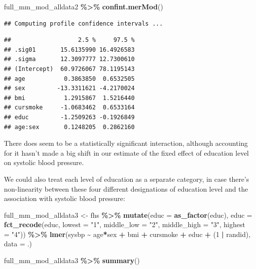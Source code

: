 \documentclass[
]{book}
\newenvironment{Shaded}{\begin{snugshade}}{\end{snugshade}}
\newcommand{\AttributeTok}[1]{\textcolor[rgb]{0.13,0.29,0.53}{#1}}
\newcommand{\DecValTok}[1]{\textcolor[rgb]{0.00,0.00,0.81}{#1}}
\newcommand{\FunctionTok}[1]{\textcolor[rgb]{0.13,0.29,0.53}{\textbf{#1}}}
\newcommand{\NormalTok}[1]{#1}
\newcommand{\OtherTok}[1]{\textcolor[rgb]{0.56,0.35,0.01}{#1}}
\newcommand{\SpecialCharTok}[1]{\textcolor[rgb]{0.81,0.36,0.00}{\textbf{#1}}}
\newcommand{\StringTok}[1]{\textcolor[rgb]{0.31,0.60,0.02}{#1}}
\begin{document}
\begin{Shaded}
\begin{Highlighting}[]
\NormalTok{full\_mm\_mod\_alldata2 }\SpecialCharTok{\%\textgreater{}\%} 
  \FunctionTok{confint.merMod}\NormalTok{()}
\end{Highlighting}
\end{Shaded}

\begin{verbatim}
## Computing profile confidence intervals ...
\end{verbatim}

\begin{verbatim}
##                   2.5 %     97.5 %
## .sig01       15.6135990 16.4926583
## .sigma       12.3097777 12.7300610
## (Intercept)  60.9726067 78.1195143
## age           0.3863850  0.6532505
## sex         -13.3311621 -4.2170024
## bmi           1.2915867  1.5216440
## cursmoke     -1.0683462  0.6533164
## educ         -1.2509263 -0.1926849
## age:sex       0.1248205  0.2862160
\end{verbatim}

There does seem to be a statistically significant interaction, although
accounting for it hasn't made a big shift in our estimate of the fixed effect
of education level on systolic blood pressure.

We could also treat each level of education as a separate category, in case
there's non-linearity between these four different designations of education
level and the association with systolic blood pressure:

\begin{Shaded}
\begin{Highlighting}[]
\NormalTok{full\_mm\_mod\_alldata3 }\OtherTok{\textless{}{-}}\NormalTok{ fhs }\SpecialCharTok{\%\textgreater{}\%} 
  \FunctionTok{mutate}\NormalTok{(}\AttributeTok{educ =} \FunctionTok{as\_factor}\NormalTok{(educ),}
         \AttributeTok{educ =} \FunctionTok{fct\_recode}\NormalTok{(educ, }
                           \AttributeTok{lowest =} \StringTok{"1"}\NormalTok{, }
                           \AttributeTok{middle\_low =} \StringTok{"2"}\NormalTok{, }
                           \AttributeTok{middle\_high =} \StringTok{"3"}\NormalTok{, }
                           \AttributeTok{highest =} \StringTok{"4"}\NormalTok{)) }\SpecialCharTok{\%\textgreater{}\%} 
  \FunctionTok{lmer}\NormalTok{(sysbp }\SpecialCharTok{\textasciitilde{}}\NormalTok{ age}\SpecialCharTok{*}\NormalTok{sex }\SpecialCharTok{+}\NormalTok{ bmi }\SpecialCharTok{+}\NormalTok{ cursmoke }\SpecialCharTok{+}\NormalTok{ educ }\SpecialCharTok{+}\NormalTok{ (}\DecValTok{1} \SpecialCharTok{|}\NormalTok{ randid), }
       \AttributeTok{data =}\NormalTok{ .) }

\NormalTok{full\_mm\_mod\_alldata3 }\SpecialCharTok{\%\textgreater{}\%} 
  \FunctionTok{summary}\NormalTok{()}
\end{Highlighting}
\end{Shaded}
\end{document}
